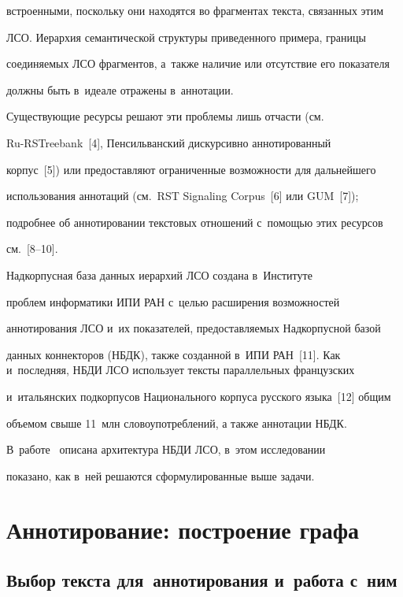встроенными, поскольку они находятся во фрагментах текста, связанных этим 


ЛСО. Иерархия семантической структуры приведенного примера, границы 


соединяемых ЛСО фрагментов, а~также наличие или отсутствие его показателя 


должны быть в~идеале отражены в~аннотации.


  


  Существующие ресурсы решают эти проблемы лишь отчасти (см.\


   \mbox{Ru-RSTreebank}~[4], Пенсильванский дискурсивно аннотированный 


корпус~[5]) или предоставляют ограниченные возможности для дальнейшего 


использования аннотаций (см.\ RST Signaling Corpus~[6] или GUM~[7]); 


подробнее об аннотировании текстовых отношений с~помощью этих ресурсов 


см.~[8--10].


  


  Надкорпусная база данных иерархий ЛСО создана в~Институте 


проблем информатики ИПИ РАН с~целью расширения возможностей 


аннотирования ЛСО и~их показателей, предоставляемых Надкорпусной базой 


данных коннекторов (НБДК), также созданной в~ИПИ РАН~[11]. Как и~последняя, НБДИ ЛСО использует тексты параллельных французских 


и~итальянских подкорпусов Национального корпуса русского языка~[12] общим 


объемом свыше 11~млн словоупотреблений, а также аннотации НБДК. 


В~работе~\cite{8-in} описана архитектура НБДИ ЛСО, в~этом исследовании 


показано, как в~ней решаются сформулированные выше задачи. 





\section{Аннотирование: построение графа}





\subsection{Выбор текста для~аннотирования и~работа с~ним}





